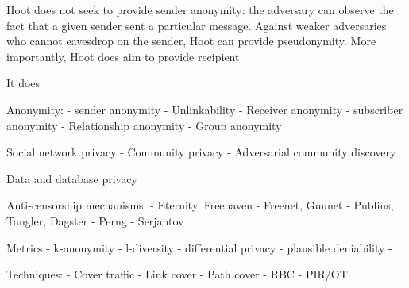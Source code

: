 Hoot does not seek to provide sender anonymity: the adversary can
observe the fact that a given sender sent a particular message. Against
weaker adversaries who cannot eavesdrop on the sender, Hoot can provide
pseudonymity. More importantly, Hoot does aim to provide recipient

It does



Anonymity:
- sender anonymity
- Unlinkability
- Receiver anonymity
- subscriber anonymity
- Relationship anonymity
- Group anonymity

Social network privacy
- Community privacy
- Adversarial community discovery

Data and database privacy

Anti-censorship mechanisms:
- Eternity, Freehaven
- Freenet, Gnunet
- Publius, Tangler, Dagster
- Perng
- Serjantov

Metrics
- k-anonymity
- l-diversity
- differential privacy
- plausible deniability
- 

Techniques:
- Cover traffic
- Link cover
- Path cover
- RBC
- PIR/OT
 



